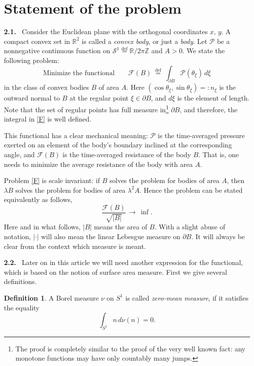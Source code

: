 \documentclass[a4paper,12pt]{article}
\newcommand{\eqdef}{\stackrel{\mathrm{def}}{=}}
\newcommand {\R}{{\mathbb R}}
\newcommand {\FFF}{\mathcal{F}}
\newcommand {\PPP}{\mathcal{P}}
\newcommand {\SSS}{\mathcal{S}^1}
\theoremstyle{remark}
\theoremstyle{definition}
\newtheorem{definition}{Definition}
\begin{document}
\section{Statement of the problem}


{\bf 2.1.} \ Consider the Euclidean plane with the orthogonal coordinates $x,\, y$. A compact convex set in $\R^2$ is called a {\it convex body}, or just a {\it body}. Let $\PPP$ be a nonnegative continuous function on $\SSS \eqdef \mathbb{R}/2\pi\mathbb{Z}$ and $A > 0$. We state the following problem:
\begin{equation}\label{F}
	\text{Minimize the functional} \qquad \FFF(B) \ \eqdef\ \int_{\partial B} \PPP({\theta_\xi})\, d\xi
\end{equation}
in the class of convex bodies $B$ of area $A$. Here  $(\cos\theta_\xi,\sin\theta_\xi) =: n_\xi$ is the outward normal to $B$ at the regular point $\xi \in \partial B$, and $d\xi$ is the element of length. Note that the set of regular points has full measure in\footnote{The proof is completely similar to the proof of the very well known fact: any monotone functions may have only countably many jumps.} $\partial B$, and therefore, the integral in \eqref{F} is well defined.

This functional has a clear mechanical meaning: $\PPP$ is the time-averaged pressure exerted on an element of the body's boundary inclined at the corresponding angle, and $\FFF(B)$ is the time-averaged resistance of the body $B$. That is, one needs to minimize the average resistance of the body with area $A.$

Problem \eqref{F} is scale invariant: if $B$ solves the problem for bodies of area $A$, then $\lambda B$ solves the problem for bodies of area $\lambda^2 A$. Hence the problem can be stated equivalently as follows,
\begin{equation}\label{ProblEquiv}
\dfrac{\FFF(B)}{\sqrt{|B|}}\, \to\, \inf.
\end{equation}
Here and in what follows, $|B|$ means the area of $B$. With a slight abuse of notation, $|\cdot|$ will also mean the linear Lebesgue measure on $\partial B$. It will always be clear from the context which measure is meant.
\vspace{2mm}

{\bf 2.2.} \ Later on in this article we will need another expression for the functional, which is based on the notion of surface area measure. First we give several definitions.

\begin{definition}
A Borel measure $\nu$ on $S^1$ is called {\it zero-mean measure}, if it satisfies the equality
$$\int_{S^1} n\, d\nu(n) = 0.$$
\end{definition}
\end{document}
